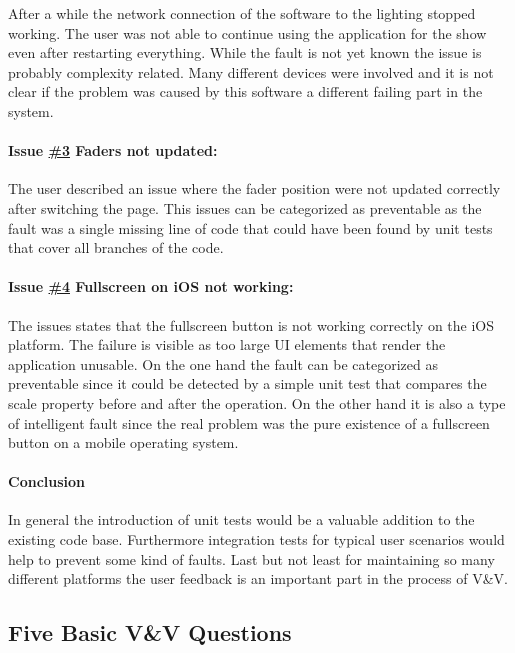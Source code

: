 \documentclass{scrartcl}
\begin{document}
After a while the network connection of the software to the lighting stopped working. The user was not able to continue using the application for the show even after restarting everything.
While the fault is not yet known the issue is probably complexity related. Many different devices were involved and it is not clear if the problem was caused by this software a  different failing part in the system.


\paragraph{Issue \href{https://github.com/ETCLabs/LuminosusEosEdition/issues/3}{\#3} Faders not updated:}

The user described an issue where the fader position were not updated correctly after switching the page.
This issues can be categorized as preventable as the fault was a single missing line of code that could have been found by unit tests that cover all branches of the code.


\paragraph{Issue \href{https://github.com/ETCLabs/LuminosusEosEdition/issues/4}{\#4} Fullscreen on iOS not working:}

The issues states that the fullscreen button is not working correctly on the iOS platform. The failure is visible as too large UI elements that render the application unusable.
On the one hand the fault can be categorized as preventable since it could be detected by a simple unit test that compares the scale property before and after the operation.
On the other hand it is also a type of intelligent fault since the real problem was the pure existence of a fullscreen button on a mobile operating system.

\paragraph{Conclusion}
In general the introduction of unit tests would be a valuable addition to the existing code base. Furthermore integration tests for typical user scenarios would help to prevent some kind of faults. Last but not least for maintaining so many different platforms the user feedback is an important part in the process of V\&V.


\subsection{Five Basic V\&V Questions}
\end{document}
